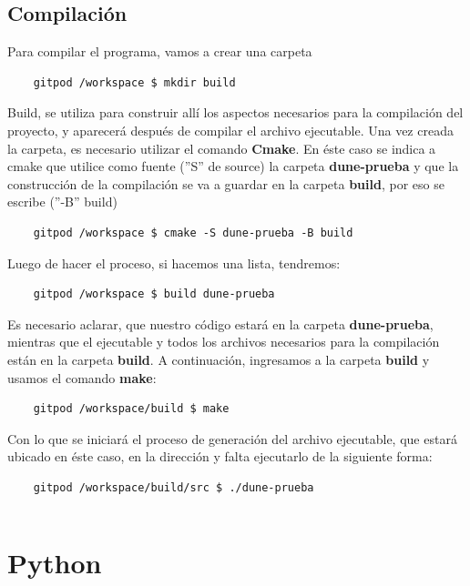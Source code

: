 \documentclass{scrarticle}
\begin{document}
\subsection{Compilación}
Para compilar el programa, vamos a crear una carpeta 
\begin{verbatim}
	gitpod /workspace $ mkdir build
\end{verbatim}
Build, se utiliza para construir allí los aspectos necesarios para la compilación del proyecto, y aparecerá después 
de compilar el archivo ejecutable.  Una vez creada la carpeta, es necesario utilizar el comando \textbf{Cmake}.  En éste caso se 
indica a cmake que utilice como fuente (''S'' de source) la carpeta \textbf{dune-prueba} y que la construcción de la 
compilación se va a guardar en la carpeta \textbf{build}, por eso se escribe (''-B'' build) 
\begin{verbatim}
	gitpod /workspace $ cmake -S dune-prueba -B build
\end{verbatim}
Luego de hacer el proceso, si hacemos una lista, tendremos:
\begin{verbatim}
	gitpod /workspace $ build dune-prueba
\end{verbatim}
Es necesario aclarar, que nuestro código estará en la carpeta \textbf{dune-prueba}, mientras que el ejecutable y 
todos los archivos necesarios para la compilación están en la carpeta \textbf{build}.  A continuación, ingresamos 
a la carpeta \textbf{build} y usamos el comando \textbf{make}:
\begin{verbatim}
	gitpod /workspace/build $ make
\end{verbatim}
Con lo que se iniciará el proceso de generación del archivo ejecutable, que estará ubicado en éste caso, en 
la dirección y falta ejecutarlo de la siguiente forma:
\begin{verbatim}
	gitpod /workspace/build/src $ ./dune-prueba
\end{verbatim}
\begin{listing}[ht!]
	\inputminted{bash}{dune-learn-1.txt}
\end{listing}
\newpage
\section{Python}
\end{document}
